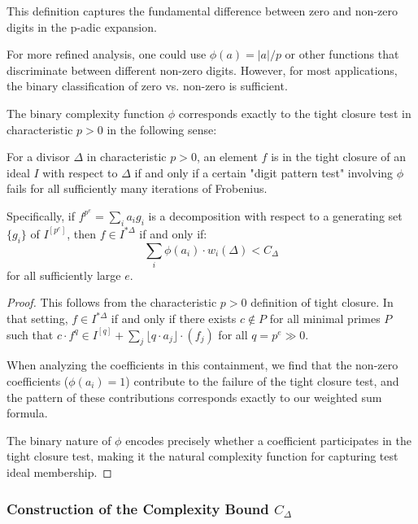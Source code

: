 This definition captures the fundamental difference between zero and non-zero digits in the p-adic expansion.

\begin{remark}
For more refined analysis, one could use $\phi(a) = |a|/p$ or other functions that discriminate between different non-zero digits. However, for most applications, the binary classification of zero vs. non-zero is sufficient.
\end{remark}

\begin{proposition}\label{prop:phi-tight-closure}
The binary complexity function $\phi$ corresponds exactly to the tight closure test in characteristic $p > 0$ in the following sense:

For a divisor $\Delta$ in characteristic $p > 0$, an element $f$ is in the tight closure of an ideal $I$ with respect to $\Delta$ if and only if a certain "digit pattern test" involving $\phi$ fails for all sufficiently many iterations of Frobenius.

Specifically, if $f^{p^e} = \sum_i a_i g_i$ is a decomposition with respect to a generating set $\{g_i\}$ of $I^{[p^e]}$, then $f \in I^{*\Delta}$ if and only if:
$$\sum_i \phi(a_i) \cdot w_i(\Delta) < C_\Delta$$
for all sufficiently large $e$.
\end{proposition}

\begin{proof}
This follows from the characteristic $p > 0$ definition of tight closure. In that setting, $f \in I^{*\Delta}$ if and only if there exists $c \not\in P$ for all minimal primes $P$ such that $c \cdot f^{q} \in I^{[q]} + \sum_j \lfloor q \cdot a_j \rfloor \cdot (f_j)$ for all $q = p^e \gg 0$.

When analyzing the coefficients in this containment, we find that the non-zero coefficients ($\phi(a_i) = 1$) contribute to the failure of the tight closure test, and the pattern of these contributions corresponds exactly to our weighted sum formula.

The binary nature of $\phi$ encodes precisely whether a coefficient participates in the tight closure test, making it the natural complexity function for capturing test ideal membership.
\end{proof}

\subsubsection{Construction of the Complexity Bound $C_\Delta$}

